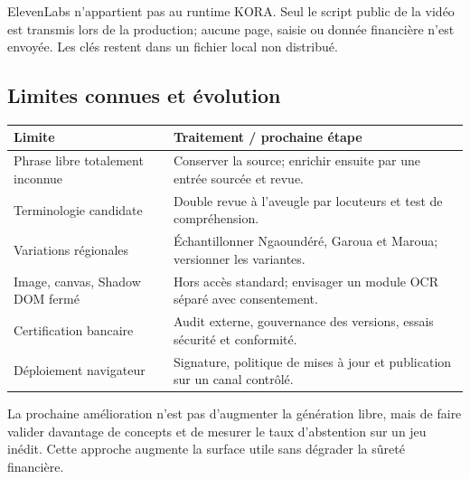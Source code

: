 ElevenLabs n’appartient pas au runtime KORA. Seul le script public de la vidéo
est transmis lors de la production; aucune page, saisie ou donnée financière
n’est envoyée. Les clés restent dans un fichier local non distribué.

\subsection{Limites connues et évolution}

\begin{tabularx}{\linewidth}{@{}|L{48mm}|Y|@{}}
\hline
\textbf{Limite} & \textbf{Traitement / prochaine étape}\\
\hline
Phrase libre totalement inconnue &
Conserver la source; enrichir ensuite par une entrée sourcée et revue.\\
\hline
Terminologie candidate &
Double revue à l’aveugle par locuteurs  et test de compréhension.\\
\hline
Variations régionales &
Échantillonner Ngaoundéré, Garoua et Maroua; versionner les variantes.\\
\hline
Image, canvas, Shadow DOM fermé &
Hors accès standard; envisager un module OCR séparé avec consentement.\\
\hline
Certification bancaire &
Audit externe, gouvernance des versions, essais sécurité et conformité.\\
\hline
Déploiement navigateur &
Signature, politique de mises à jour et publication sur un canal contrôlé.\\
\hline
\end{tabularx}

\begin{warningbox}
La prochaine amélioration n’est pas d’augmenter la génération libre, mais de
faire valider davantage de concepts et de mesurer le taux d’abstention sur un
jeu inédit. Cette approche augmente la surface utile sans dégrader la sûreté
financière.
\end{warningbox}
